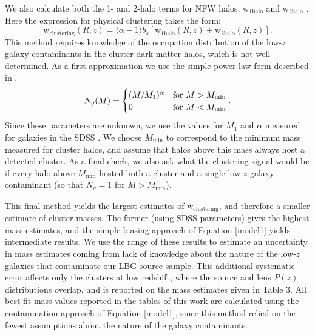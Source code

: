 We also calculate both the 1- and 2-halo terms for NFW halos, w$_{\mathrm{1halo}}$ and w$_{\mathrm{2halo}}$ \citep[again using the code and methods described in][]{Hamana04}. Here the expression for physical clustering takes the form:
\begin{equation}
\mathrm{w}_{\mathrm{clustering}}(R,z) = \langle \alpha-1 \rangle b_{s} \left[\mathrm{w}_{\mathrm{1halo}}(R,z)+\mathrm{w}_{\mathrm{2halo}}(R,z)\right].
\end{equation}
This method requires knowledge of the occupation distribution of the low-$z$ galaxy contaminants in the cluster dark matter halos, which is not well determined. As a first approximation we use the simple power-law form described in \citet{Hamana04},
\begin{equation}
N_g(M) = \begin{cases} (M/M_1)^\alpha & \text{for $M > M_{\mathrm{min}}$} \\ 0 & \text{for $ M < M_{\mathrm{min}}$} \end{cases}.
\end{equation}
Since these parameters are unknown, we use the values for $M_1$ and $\alpha$ measured for galaxies in the SDSS \citep[see Table 3 of][]{Zehavi11}. We choose $M_{\mathrm{min}}$ to correspond to the minimum mass measured for cluster halos, and assume that halos above this mass always host a detected cluster. As a final check, we also ask what the clustering signal would be if every halo above $M_{\mathrm{min}}$ hosted both a cluster and a single low-$z$ galaxy contaminant (so that $N_g = 1$ for $M > M_{\mathrm{min}}$).

This final method yields the largest estimates of $\mathrm{w}_{\mathrm{clustering}}$, and therefore a smaller estimate of cluster masses. The former (using SDSS parameters) gives the highest mass estimates, and the simple biasing approach of Equation \ref{model1} yields intermediate results. We use the range of these results to estimate an uncertainty in mass estimates coming from lack of knowledge about the nature of the low-$z$ galaxies that contaminate our LBG source sample. This additional systematic error affects only the clusters at low redshift, where the source and lens $P(z)$ distributions overlap, and is reported on the mass estimates given in Table 3. All best fit mass values reported in the tables of this work are calculated using the contamination approach of Equation \ref{model1}, since this method relied on the fewest assumptions about the nature of the galaxy contaminants.


